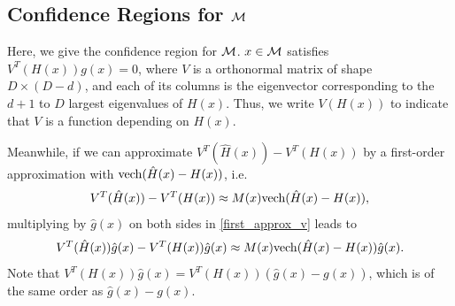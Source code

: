 \documentclass[aos,preprint]{imsart}
\theoremstyle{remark}
\begin{document}
\subsection{Confidence Regions for $\cal M$}
Here, we give the confidence region for $\cal M$. $x\in\cal M$ satisfies $V^T(H(x))g(x) = 0$, where $V$ is a orthonormal matrix of shape $D\times (D-d)$, and each of its columns is the eigenvector corresponding to the $d+1$ to $D$ largest eigenvalues of $H(x)$. Thus, we write $V(H(x))$ to indicate that $V$ is a function depending on $H(x)$.

Meanwhile, if we can approximate $V^T({\hat{H}}(x))- V^T(H(x))$ by a first-order approximation with ${\rm vech}(\hat{H}(x)-H(x))$, i.e.
\begin{equation}\label{first_approx_v}
V^T({\hat{H}}(x))- V^T(H(x))\approx M(x){\rm vech}(\hat{H}(x)-H(x)),
\end{equation}
multiplying by $\hat{g}(x)$ on both sides in \eqref{first_approx_v} leads to
\[
V^T({\hat{H}}(x))\hat{g}(x)- V^T(H(x))\hat{g}(x)\approx M(x){\rm vech}(\hat{H}(x)-H(x))\hat{g}(x).
\]
Note that $V^T(H(x))\hat{g}(x) = V^T(H(x))(\hat{g}(x) - g(x))$, which is of the same order as $\hat{g}(x) - g(x)$.
\end{document}
